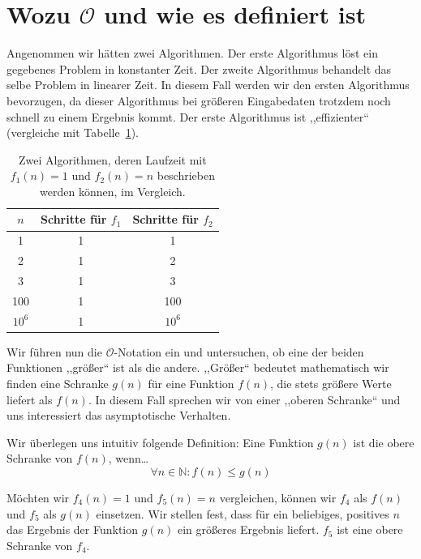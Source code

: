 \section{Wozu $\mathcal{O}$ und wie es definiert ist}
%
Angenommen wir hätten zwei Algorithmen. Der erste Algorithmus löst ein gegebenes Problem in konstanter Zeit. Der zweite Algorithmus behandelt das selbe Problem in linearer Zeit. In diesem Fall werden wir den ersten Algorithmus bevorzugen, da dieser Algorithmus bei größeren Eingabedaten trotzdem noch schnell zu einem Ergebnis kommt. Der erste Algorithmus ist ,,effizienter`` (vergleiche mit Tabelle~\ref{tab:constant_vs_linear}).
%
\begin{table}[p]
 \begin{center}
  \begin{tabular}{ccc}
  \hline \hline
   $n$     & Schritte für $f_1$ & Schritte für $f_2$ \\
  \hline
   1       & 1                  & 1 \\
   2       & 1                  & 2 \\
   3       & 1                  & 3 \\
   100     & 1                 & 100 \\
   $10^6$  & 1              & $10^6$ \\
 \hline \hline
  \end{tabular}
  \caption{Zwei Algorithmen, deren Laufzeit mit $f_1(n) = 1$ und $f_2(n) = n$ beschrieben werden können, im Vergleich.}
  \label{tab:constant_vs_linear}
 \end{center}
\end{table}

Wir führen nun die $\mathcal{O}$-Notation ein und untersuchen, ob eine der beiden Funktionen ,,größer`` ist als die andere. ,,Größer`` bedeutet mathematisch wir finden eine Schranke $g(n)$ für eine Funktion $f(n)$, die stets größere Werte liefert als $f(n)$. In diesem Fall sprechen wir von einer ,,oberen Schranke`` und uns interessiert das asymptotische Verhalten.

Wir überlegen uns intuitiv folgende Definition: Eine Funktion $g(n)$ ist die obere Schranke von $f(n)$, wenn\dots
\[
  \forall n \in \mathbb{N}: f(n) \leq g(n)
\]

Möchten wir $f_4(n) = 1$ und $f_5(n) = n$ vergleichen, können wir $f_4$ als $f(n)$ und $f_5$ als $g(n)$ einsetzen. Wir stellen fest, dass für ein beliebiges, positives $n$ das Ergebnis der Funktion $g(n)$ ein größeres Ergebnis liefert. $f_5$ ist eine obere Schranke von $f_4$.

